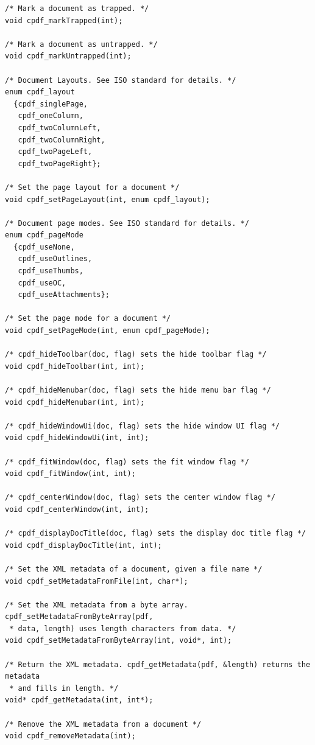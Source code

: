 \documentclass[a4paper]{memoir}
\begin{document}
\begin{small}
\begin{lstlisting}
/* Mark a document as trapped. */
void cpdf_markTrapped(int);

/* Mark a document as untrapped. */
void cpdf_markUntrapped(int);

/* Document Layouts. See ISO standard for details. */
enum cpdf_layout
  {cpdf_singlePage,
   cpdf_oneColumn,
   cpdf_twoColumnLeft,
   cpdf_twoColumnRight,
   cpdf_twoPageLeft,
   cpdf_twoPageRight};

/* Set the page layout for a document */
void cpdf_setPageLayout(int, enum cpdf_layout);

/* Document page modes. See ISO standard for details. */
enum cpdf_pageMode
  {cpdf_useNone,
   cpdf_useOutlines,
   cpdf_useThumbs,
   cpdf_useOC,
   cpdf_useAttachments};

/* Set the page mode for a document */
void cpdf_setPageMode(int, enum cpdf_pageMode);

/* cpdf_hideToolbar(doc, flag) sets the hide toolbar flag */
void cpdf_hideToolbar(int, int);

/* cpdf_hideMenubar(doc, flag) sets the hide menu bar flag */
void cpdf_hideMenubar(int, int);

/* cpdf_hideWindowUi(doc, flag) sets the hide window UI flag */
void cpdf_hideWindowUi(int, int);

/* cpdf_fitWindow(doc, flag) sets the fit window flag */
void cpdf_fitWindow(int, int);

/* cpdf_centerWindow(doc, flag) sets the center window flag */
void cpdf_centerWindow(int, int);

/* cpdf_displayDocTitle(doc, flag) sets the display doc title flag */
void cpdf_displayDocTitle(int, int);

/* Set the XML metadata of a document, given a file name */
void cpdf_setMetadataFromFile(int, char*);

/* Set the XML metadata from a byte array. cpdf_setMetadataFromByteArray(pdf,
 * data, length) uses length characters from data. */
void cpdf_setMetadataFromByteArray(int, void*, int);

/* Return the XML metadata. cpdf_getMetadata(pdf, &length) returns the metadata
 * and fills in length. */ 
void* cpdf_getMetadata(int, int*);

/* Remove the XML metadata from a document */
void cpdf_removeMetadata(int);
\end{lstlisting}
\end{small}
\end{document}
